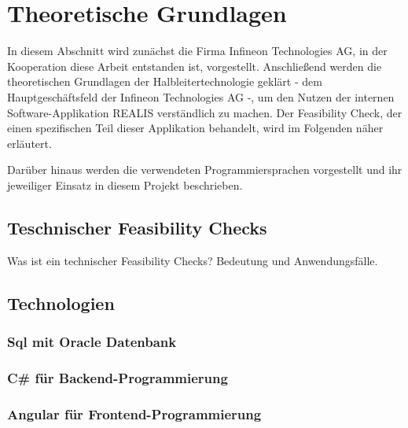 \chapter{Theoretische Grundlagen}\label{Chap:TheoretischeGrundlagen}
In diesem Abschnitt wird zunächst die Firma Infineon Technologies AG, in der Kooperation diese Arbeit entstanden ist, vorgestellt. Anschließend werden die theoretischen Grundlagen der Halbleitertechnologie geklärt - dem Hauptgeschäftsfeld der Infineon Technologies AG -, um den Nutzen der internen Software-Applikation \ac{REALIS} verständlich zu machen. Der Feasibility Check, der einen spezifischen Teil dieser Applikation behandelt, wird im Folgenden näher erläutert.

Darüber hinaus werden die verwendeten Programmiersprachen vorgestellt und ihr jeweiliger Einsatz in diesem Projekt beschrieben.








\section{Teschnischer Feasibility Checks}
Was ist ein technischer Feasibility Checks? Bedeutung und Anwendungsfälle.

\section{Technologien}

\subsection{Sql mit Oracle Datenbank}

\subsection{C\# für Backend-Programmierung}

\subsection{Angular für Frontend-Programmierung}